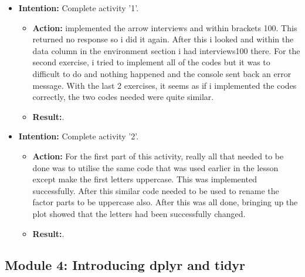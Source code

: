 \documentclass{article}
\begin{document}
\begin{itemize}
 
\item{\textbf{Intention:} Complete activity '1'.}

\begin{itemize}
\item{\textbf{Action:} implemented the arrow interviews and within brackets 100. This returned no response so i did it again. After this i looked and within the data column in the environment section i had interviews100 there. For the second exercise, i tried to implement all of the codes but it was to difficult to do and nothing happened and the console sent back an error message. With the last 2 exercises, it seems as if i implemented the codes correctly, the two codes needed were quite similar.}
\item{\textbf{Result:}.}
\end{itemize}


\item{\textbf{Intention:} Complete activity '2'.}

\begin{itemize}
\item{\textbf{Action:} For the first part of this activity, really all that needed to be done was to utilise the same code that was used earlier in the lesson except make the first letters uppercase. This was implemented successfully. After this similar code needed to be used to rename the factor parts to be uppercase also. After this was all done, bringing up the plot showed that the letters had been successfully changed.}
\item{\textbf{Result:}.}
\end{itemize}


\end{itemize}




\subsection{Module 4: Introducing dplyr and tidyr}
\end{document}
